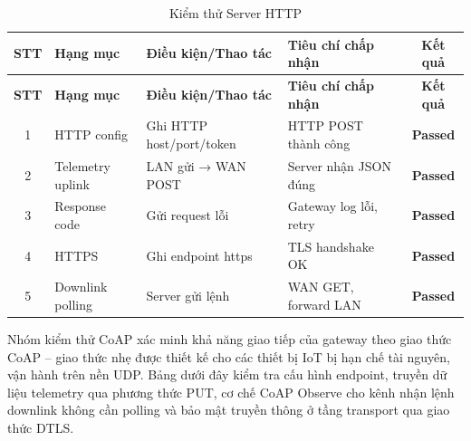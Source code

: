         \begin{longtable}{|c|p{3cm}|p{4cm}|p{5cm}|c|}
            \caption{Kiểm thử Server HTTP}
            \label{tab:test_http} \\
            \hline
            \textbf{STT} & \textbf{Hạng mục} & \textbf{Điều kiện/Thao tác} & \textbf{Tiêu chí chấp nhận} & \textbf{Kết quả} \\ \hline
            \endfirsthead

            \hline
            \textbf{STT} & \textbf{Hạng mục} & \textbf{Điều kiện/Thao tác} & \textbf{Tiêu chí chấp nhận} & \textbf{Kết quả} \\ \hline
            \endhead

            \hline
            \endfoot
            \endlastfoot

            1 & HTTP config & Ghi HTTP host/port/token & HTTP POST thành công & \textcolor{modern_blue}{\textbf{Passed}} \\ \hline
            2 & Telemetry uplink & LAN gửi → WAN POST & Server nhận JSON đúng & \textcolor{modern_blue}{\textbf{Passed}} \\ \hline
            3 & Response code & Gửi request lỗi & Gateway log lỗi, retry & \textcolor{modern_blue}{\textbf{Passed}} \\ \hline
            4 & HTTPS & Ghi endpoint https & TLS handshake OK & \textcolor{modern_blue}{\textbf{Passed}} \\ \hline
            5 & Downlink polling & Server gửi lệnh & WAN GET, forward LAN & \textcolor{modern_blue}{\textbf{Passed}} \\ \hline
        \end{longtable}

        Nhóm kiểm thử CoAP xác minh khả năng giao tiếp của gateway theo giao thức CoAP -- giao thức nhẹ được thiết kế cho các thiết bị IoT bị hạn chế tài nguyên, vận hành trên nền UDP. Bảng dưới đây kiểm tra cấu hình endpoint, truyền dữ liệu telemetry qua phương thức PUT, cơ chế CoAP Observe cho kênh nhận lệnh downlink không cần polling và bảo mật truyền thông ở tầng transport qua giao thức DTLS.

